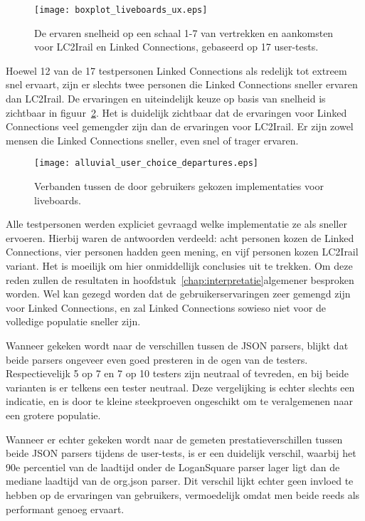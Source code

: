 \begin{figure}[h]
	\centering
	\texttt{[image: boxplot\_liveboards\_ux.eps]}
	\caption[Ervaren snelheid van liveboards]{De ervaren snelheid op een schaal 1-7 van vertrekken en aankomsten voor LC2Irail en Linked Connections, gebaseerd op 17 user-tests.}
	\label{fig:liveboardsUx}
\end{figure}

Hoewel 12 van de 17 testpersonen Linked Connections als redelijk tot extreem snel ervaart, zijn er slechts twee personen die Linked Connections sneller ervaren dan LC2Irail. De ervaringen en uiteindelijk keuze op basis van snelheid is zichtbaar in figuur~\ref{fig:alluvialUserChoicesLiveboards}. Het is duidelijk zichtbaar dat de ervaringen voor Linked Connections veel gemengder zijn dan de ervaringen voor LC2Irail. Er zijn zowel mensen die Linked Connections sneller, even snel of trager ervaren. 

\begin{figure}[ht]
	\centering
	\texttt{[image: alluvial\_user\_choice\_departures.eps]}
	\caption[Door gebruikers gekozen implementatie voor liveboards]{Verbanden tussen de door gebruikers gekozen implementaties voor liveboards. }
	\label{fig:alluvialUserChoicesLiveboards}
\end{figure}

Alle testpersonen werden expliciet gevraagd welke implementatie ze als sneller ervoeren. Hierbij waren de antwoorden verdeeld: acht personen kozen de Linked Connections, vier personen hadden geen mening, en vijf personen kozen LC2Irail variant. Het is moeilijk om hier onmiddellijk conclusies uit te trekken. Om deze reden zullen de resultaten in hoofdstuk~\ref{chap:interpretatie}algemener besproken worden. Wel kan gezegd worden dat de gebruikerservaringen zeer gemengd zijn voor Linked Connections, en zal Linked Connections sowieso niet voor de volledige populatie sneller zijn.

Wanneer gekeken wordt naar de verschillen tussen de JSON parsers, blijkt dat beide parsers ongeveer even goed presteren in de ogen van de testers. Respectievelijk 5 op 7 en 7 op 10 testers zijn neutraal of tevreden, en bij beide varianten is er telkens een tester neutraal. Deze vergelijking is echter slechts een indicatie, en is door te kleine steekproeven ongeschikt om te veralgemenen naar een grotere populatie.

Wanneer er echter gekeken wordt naar de gemeten prestatieverschillen tussen beide JSON parsers tijdens de user-tests, is er een duidelijk verschil, waarbij het 90e percentiel van de laadtijd onder de LoganSquare parser lager ligt dan de mediane laadtijd van de org.json parser. Dit verschil lijkt echter geen invloed te hebben op de ervaringen van gebruikers, vermoedelijk omdat men beide reeds als performant genoeg ervaart. %

